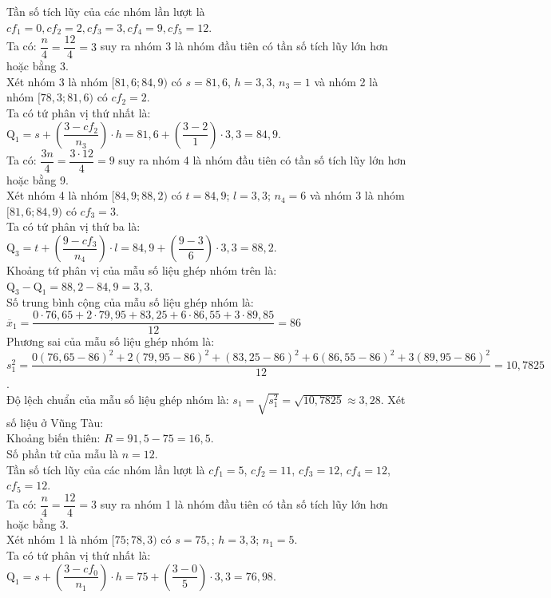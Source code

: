 \begin{ex}
{\begin{itemchoice}
			Tần số tích lũy  của các nhóm lần lượt là $cf_1=0,cf_2=2,cf_3=3,cf_4=9,cf_5=12$.\\
			Ta có: $\dfrac{n}{4}=\dfrac{12}{4}=3$ suy ra  nhóm 3 là nhóm đầu tiên có tần số tích lũy lớn hơn hoặc bằng 3. \\
			Xét nhóm 3 là nhóm $[81{,}6;84{,}9)$  có $s=81{,}6$, $h=3{,}3$, $n_3=1$ và nhóm 2 là nhóm $[78{,}3;81{,}6)$ có $cf_2=2$. \\
			Ta có tứ phân vị thứ nhất là: $\mathrm{Q}_1=s+\left(\dfrac{3-cf_2}{n_3}\right)\cdot h =81{,}6+\left(\dfrac{3-2}{1}\right)\cdot  3{,}3=84{,}9$.\\
			Ta có: $\dfrac{3n}{4}=\dfrac{3\cdot 12}{4}=9$ suy ra nhóm 4  là nhóm đầu tiên có tần số tích lũy lớn hơn hoặc bằng 9. \\
			Xét  nhóm 4 là nhóm $[84{,}9;88{,}2)$ có $t=84{,}9$; $l=3{,}3$; $n_4=6$ và nhóm 3 là nhóm $[81{,}6;84{,}9)$ có $cf_3=3$.\\
			Ta có tứ phân vị thứ ba là: $\mathrm{Q}_3=t+\left(\dfrac{9-cf_3}{n_4}\right)\cdot l =84{,}9+\left(\dfrac{9-3}{6}\right)\cdot 3{,}3=88{,}2$.\\ 
			Khoảng tứ phân vị của mẫu số liệu ghép nhóm trên  là: $\mathrm{Q}_3-\mathrm{Q}_1=88{,}2-84{,}9=3{,}3$.\\
			 Số trung bình cộng của mẫu số liệu ghép nhóm là: \\
			 $\overline{x}_1=\dfrac{0\cdot 76{,}65+2\cdot 79{,}95+83{,}25+6\cdot 86{,}55+3\cdot 89{,}85}{12}=86$\\
			Phương  sai của mẫu số liệu ghép nhóm là:\\
			 $s_1^2=\dfrac{0(76{,}65-86)^2+2(79{,}95-86)^2+(83{,}25-86)^2+6(86{,}55-86)^2+3(89{,}95-86)^2}{12}=10{,}7825$.\\
			 Độ lệch chuẩn của mẫu số liệu ghép nhóm là: $s_1=\sqrt{s_1^2}=\sqrt{10{,}7825}\approx 3{,}28$.
			\itemch Xét số liệu ở Vũng Tàu:\\ 
			Khoảng  biến thiên: $R=91{,}5-75=16{,}5$.\\
			 Số phần tử của mẫu là $n=12$.\\
			Tần số tích lũy của các nhóm lần lượt là $cf_1=5$, $cf_2=11$, $cf_3=12$, $cf_4=12$, $cf_5=12$.\\ 
			Ta có: $\dfrac{n}{4}=\dfrac{12}{4}=3$ suy ra nhóm 1 là nhóm đầu tiên có tần số tích lũy lớn hơn hoặc bằng 3. \\ 
			Xét nhóm 1 là nhóm $[75;78{,}3)$ có $s=75,$;  $h=3{,}3$; $n_1=5$.\\
			Ta có tứ phân vị thứ nhất là: $\mathrm{Q}_1=s+\left(\dfrac{3-cf_0}{n_1}\right)\cdot  h =75+\left(\dfrac{3-0}{5}\right)\cdot 3{,}3=76{,}98$.\\

\end{itemchoice}}
\end{ex}
